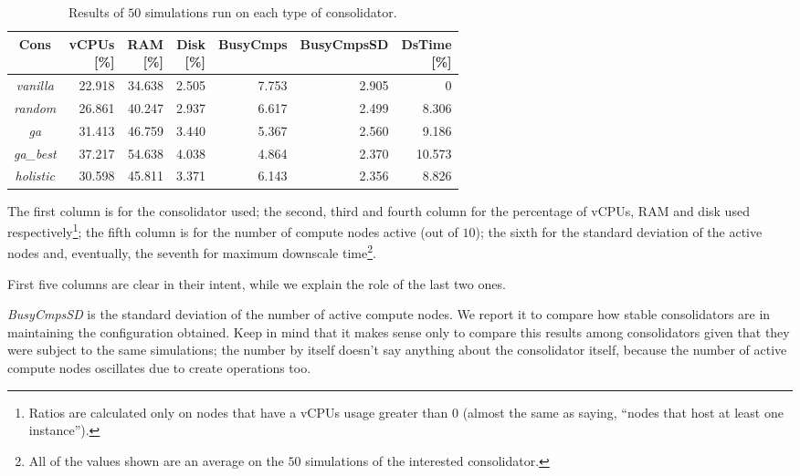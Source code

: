 \begin{table}[H]
\centering
  \begin{tabular}{| c | r | r | r | r | r | r |}
  \hline
  \textbf{Cons} & 
  \allownewline[t]{\textbf{vCPUs}\\[0pt]\textbf{[\%]}} & 
  \allownewline[t]{\textbf{RAM}\\[0pt]\textbf{[\%]}} & 
  \allownewline[t]{\textbf{Disk}\\[0pt]\textbf{[\%]}} & 
  \textbf{BusyCmps} & 
  \textbf{BusyCmpsSD} & 
  \allownewline[t]{\textbf{DsTime}\\[0pt]\textbf{[\%]}} \\
  \hline
  \emph{vanilla} & 22.918 & 34.638 & 2.505 & 7.753 & 2.905 & 0 \\
  \hline
  \emph{random} & 26.861 & 40.247 & 2.937 & 6.617 & 2.499 & 8.306 \\
  \hline
  \emph{ga} & 31.413 & 46.759 & 3.440 & 5.367 & 2.560 & 9.186 \\
  \hline
  \emph{ga\_best} & 37.217 & 54.638 & 4.038 & 4.864 & 2.370 & 10.573 \\
  \hline
  \emph{holistic} & 30.598 & 45.811 & 3.371 & 6.143 & 2.356 & 8.826 \\
  \hline
  \end{tabular}
  \vspace{2mm}
  \caption{Results of $50$ simulations run on each type of consolidator.}
  \label{tab:cons_vs}
\end{table}

The first column is for the consolidator used; the second, third and fourth column for the percentage of vCPUs, RAM and disk used respectively\footnote{Ratios are calculated only on nodes that have a vCPUs usage greater than $0$ (almost the same as saying, ``nodes that host at least one instance'').}; the fifth column is for the number of compute nodes active (out of $10$); the sixth for the standard deviation of the active nodes and, eventually, the seventh for maximum downscale time\footnote{All of the values shown are an average on the $50$ simulations of the interested consolidator.}.

First five columns are clear in their intent, while we explain the role of the last two ones.

\textit{BusyCmpsSD} is the standard deviation of the number of active compute nodes. We report it to compare how stable consolidators are in maintaining the configuration obtained. Keep in mind that it makes sense only to compare this results among consolidators given that they were subject to the same simulations; the number by itself doesn't say anything about the consolidator itself, because the number of active compute nodes oscillates due to create operations too.


